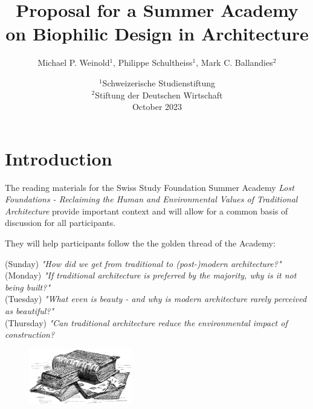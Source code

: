 \documentclass[a4paper]{article}
\title{Proposal for a Summer Academy \protect\\ on Biophilic Design in Architecture}
\author{Michael P. Weinold$^1$, Philippe Schultheiss$^1$, Mark C. Ballandies$^2$}
\date{
    $^1$Schweizerische Studienstiftung \\
    $^2$Stiftung der Deutschen Wirtschaft \\[3mm]
    October 2023
}
\begin{document}


\clearpage

\section*{\centering Introduction}

The reading materials for the Swiss Study Foundation Summer Academy \textit{Lost Foundations - Reclaiming the Human and Environmental Values of Traditional Architecture} provide important context and will allow for a common basis of discussion for all participants.

They will help participants follow the the golden thread of the Academy:

(Sunday) \textit{"How did we get from traditional to (post-)modern architecture?"} \\
(Monday) \textit{"If traditional architecture is preferred by the majority, why is it not being built?"} \\
(Tuesday) \textit{"What even is beauty - and why is modern architecture rarely perceived as beautiful?"}  \\
(Thursday) \textit{"Can traditional architecture reduce the environmental impact of construction?}

\begin{figure}[h]
  \centering
  \includegraphics[width=0.4\textwidth]{./figures/books.jpg}
\end{figure}

\end{document}
